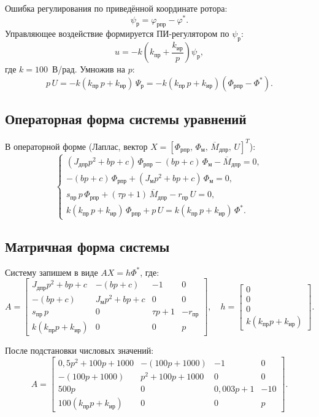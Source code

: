 \documentclass[a4paper]{extarticle}
\begin{document}
Ошибка регулирования по приведённой координате ротора:
\[
\psi_{\text{р}} = \varphi_{\text{рпр}} - \varphi^*.
\]
Управляющее воздействие формируется ПИ-регулятором по $\psi_{\text{р}}$:
\[
u = -k\!\left(k_{\text{пр}} + \frac{k_{\text{ир}}}{p}\right)\!\psi_{\text{р}},
\]
где $k=100$~В/рад. Умножив на $p$:
\[
p\,U = -k(k_{\text{пр}}\,p + k_{\text{ир}})\,\Psi_{\text{р}}
      = -k(k_{\text{пр}}\,p + k_{\text{ир}})(\Phi_{\text{рпр}} - \Phi^*).
\]

\subsection{Операторная форма системы уравнений}

В операторной форме (Лаплас, вектор $X = [\Phi_{\text{рпр}},\,\Phi_{\text{м}},\,\overline{M}_{\text{дпр}},\,U]^T$):
\[
\begin{cases}
(J_{\text{дпр}}p^2+bp+c)\,\Phi_{\text{рпр}} - (bp+c)\,\Phi_{\text{м}} - \overline{M}_{\text{дпр}} = 0,\\
-(bp+c)\,\Phi_{\text{рпр}} + (J_{\text{м}}p^2+bp+c)\,\Phi_{\text{м}} = 0,\\
s_{\text{пр}}\,p\,\Phi_{\text{рпр}} + (\tau p+1)\,\overline{M}_{\text{дпр}} - r_{\text{пр}}\,U = 0,\\
k(k_{\text{пр}}\,p+k_{\text{ир}})\,\Phi_{\text{рпр}} + p\,U
= k(k_{\text{пр}}\,p+k_{\text{ир}})\,\Phi^*.
\end{cases}
\]

\subsection{Матричная форма системы}

Систему запишем в виде $AX = h\Phi^*$, где:
\[
A=
\begin{bmatrix}
J_{\text{дпр}}p^2+bp+c & -(bp+c) & -1 & 0\\
-(bp+c) & J_{\text{м}}p^2+bp+c & 0 & 0\\
s_{\text{пр}}\,p & 0 & \tau p+1 & -r_{\text{пр}}\\
k(k_{\text{пр}}p+k_{\text{ир}}) & 0 & 0 & p
\end{bmatrix},
\quad
h=
\begin{bmatrix}0\\0\\0\\k(k_{\text{пр}}p+k_{\text{ир}})\end{bmatrix}.
\]

После подстановки числовых значений:
\[
A=
\begin{bmatrix}
0{,}5p^2+100p+1000 & -(100p+1000) & -1 & 0\\
-(100p+1000) & p^2+100p+1000 & 0 & 0\\
500p & 0 & 0{,}003p+1 & -10\\
100(k_{\text{пр}}p+k_{\text{ир}}) & 0 & 0 & p
\end{bmatrix}.
\]
\end{document}
